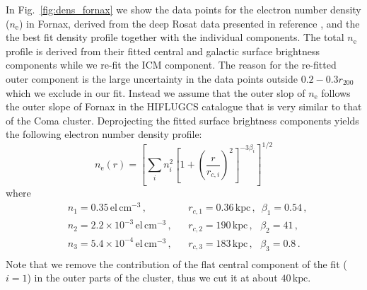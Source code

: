 \documentclass[10pt,aps,pra,reprint,amsmath,amsfonts,amssymb,showpacs,nofootinbib,floatfix]{revtex4-1}
\newcommand{\rmn}{\mathrm}
\newcommand{\kpc}{\rmn{kpc}}
\newcommand{\rvir}{r_{200}}
\newcommand{\e}{\rmn{e}}
\begin{document}
In Fig.~\ref{fig:dens_fornax} we show the data points for the electron
number density ($n_\e$) in Fornax, derived from the deep Rosat data
presented in reference \cite{2002ApJ...565..883P}, and the the best
fit density profile together with the individual components. The total
$n_\e$ profile is derived from their fitted central and galactic
surface brightness components while we re-fit the ICM component. The
reason for the re-fitted outer component is the large uncertainty in
the data points outside $0.2-0.3\rvir$ which we exclude in our
fit. Instead we assume that the outer slop of $n_\e$ follows the outer
slope of Fornax in the HIFLUGCS catalogue that is very similar to that
of the Coma cluster. Deprojecting the fitted surface brightness
components yields the following electron number density profile:
\begin{equation}
n_\e(r) = \left[\sum_i n_i^2\left[1+\left(\frac{r}{r_{c,i}}\right)^2\right]^{-3\beta_i}\right]^{1/2}
\end{equation}
where
\begin{align}
&n_1 = 0.35\, \rmn{el}\,\rmn{cm}^{-3}\,,
&&r_{c,1} = 0.36\,\kpc\,,\,\,\,
\beta_1 = 0.54\,, \nonumber\\
&n_2 = 2.2\times10^{-3}\,\rmn{el}\,\rmn{cm}^{-3}\,,
&&r_{c,2} = 190\,\kpc\,,\,\,\,\,
\beta_2 = 41\,, \nonumber\\
&n_3 = 5.4\times10^{-4}\,\rmn{el}\,\rmn{cm}^{-3}\,,
&&r_{c,3} = 183\,\kpc\,,\,\,\,\,
\beta_3 = 0.8\,. \nonumber\\
& &&
\label{fit_fornax}
\end{align}
Note that we remove the contribution of the flat central component of
the fit ($i=1$) in the outer parts of the cluster, thus we cut it at
about $40\,\kpc$.
\end{document}
